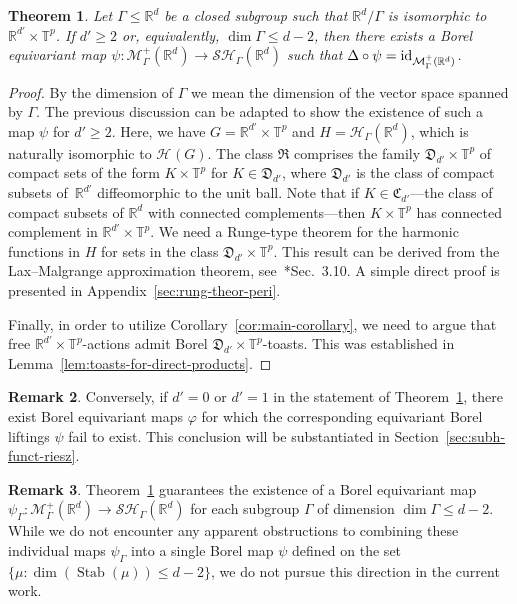 \documentclass[12pt]{paper}
\numberwithin{equation}{section}
\theoremstyle{plain}
\newtheorem{theorem}{Theorem}[section]
\theoremstyle{definition}
\newtheorem{remark}[theorem]{Remark}
\newcommand{\R}{\mathbb{R}}
\newcommand{\Rd}{\mathbb{R}^{d}}
\newcommand{\T}{\mathbb{T}}
\newcommand{\mfC}{\mathfrak{C}}
\newcommand{\mfD}{\mathfrak{D}}
\newcommand{\mfR}{\mathfrak{R}}
\newcommand{\measp}[2][]{\mathcal{M}_{#1}^+(#2)}
\newcommand{\harm}[2][]{\mathcal{H}_{#1}(#2)}
\newcommand{\sharm}[2][]{\mathcal{SH}_{#1}(#2)}
\DeclareMathOperator{\stab}{\mathrm{Stab}}
\renewcommand{\phi}{\varphi}
\begin{document}
\begin{theorem}
  \label{thm:equivariant-poisson-not-free}
  Let \(\Gamma \le \Rd\) be a closed subgroup such that \(\Rd/\Gamma\) is isomorphic to
  \(\R^{d'} \times \T^{p}\).  If \(d' \ge 2\) or, equivalently, \(\dim \Gamma \le d-2\), then there
  exists a Borel equivariant map \(\psi: \measp[\Gamma]{\Rd} \to \sharm[\Gamma]{\Rd}\) such that
  \(\Delta\circ\psi={\rm id}_{\measp[\Gamma]{\Rd}}\).
\end{theorem}

\begin{proof}
  By the dimension of \(\Gamma\) we mean the dimension of the vector space spanned by \(\Gamma\).
  The previous discussion can be adapted to show the existence of such a map \(\psi\) for
  \(d' \ge 2\).  Here, we have \(G = \R^{d'} \times \T^{p}\) and \(H = \harm[\Gamma]{\Rd}\), which
  is naturally isomorphic to \(\harm{G}\).  The class \(\mfR\) comprises the family
  \(\mfD_{d'} \times \T^p\) of compact sets of the form \(K \times \T^p\) for \(K \in \mfD_{d'}\),
  where \(\mfD_{d'}\) is the class of compact subsets of~\(\R^{d'}\) diffeomorphic to the unit ball.
  Note that if \(K\in \mfC_{d'}\)---the class of compact subsets of \(\Rd\) with connected
  complements---then \(K\times \T^{p}\) has connected complement in \(\R^{d'}\times \T^{p}\). We
  need a Runge-type theorem for the harmonic functions in \(H\) for sets in the class
  \(\mfD_{d'} \times \T^{p}\). This result can be derived from the Lax--Malgrange approximation
  theorem, see~\cite{narasimhanAnalysisRealComplex1985}*{Sec.~3.10}.  A simple direct proof is
  presented in Appendix~\ref{sec:rung-theor-peri}.

  Finally, in order to utilize Corollary~\ref{cor:main-corollary}, we need to argue that free
  \(\R^{d'} \times \T^{p}\)-actions admit Borel \(\mfD_{d'} \times \T^{p}\)-toasts.  This was
  established in Lemma~\ref{lem:toasts-for-direct-products}.
\end{proof}

\begin{remark}
  \label{rem:converse-Laplacian}
  Conversely, if \(d' = 0\) or \(d' = 1\) in the statement of
  Theorem~\ref{thm:equivariant-poisson-not-free}, there exist Borel equivariant maps \(\phi\) for
  which the corresponding equivariant Borel liftings \(\psi\) fail to exist. This conclusion will be
  substantiated in Section~\ref{sec:subh-funct-riesz}.
\end{remark}

\begin{remark}
  \label{rem:combine-periodic}
  Theorem~\ref{thm:equivariant-poisson-not-free} guarantees the existence of a Borel equivariant map
  \(\psi_{\Gamma} : \measp[\Gamma]{\Rd} \to \sharm[\Gamma]{\Rd}\) for each subgroup \(\Gamma\) of
  dimension \(\dim \Gamma \le d-2\).  While we do not encounter any apparent obstructions to
  combining these individual maps \(\psi_{\Gamma}\) into a single Borel map \(\psi\) defined on the
  set \(\{\mu : \dim (\stab(\mu)) \le d-2\}\), we do not pursue this direction in the current work.
\end{remark}
\end{document}

